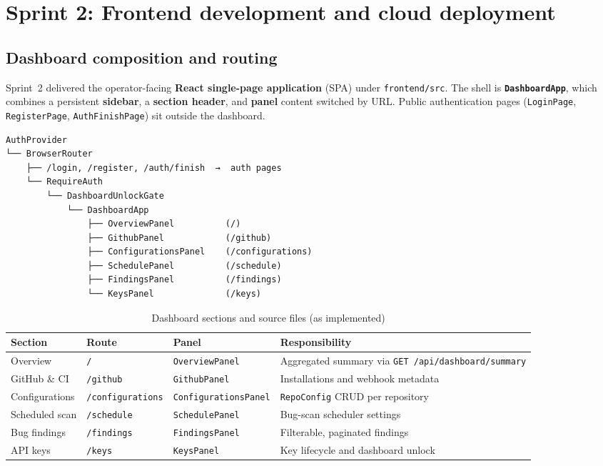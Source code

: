 
\section{Sprint 2: Frontend development and cloud deployment}
\label{sec:sprint2-frontend}

\subsection{Dashboard composition and routing}
\label{subsec:dashboard-routing}

Sprint~2 delivered the operator-facing \textbf{React single-page application} (SPA) under \texttt{frontend/src}. The shell is \textbf{\texttt{DashboardApp}}, which combines a persistent \textbf{sidebar}, a \textbf{section header}, and \textbf{panel} content switched by URL. Public authentication pages (\texttt{LoginPage}, \texttt{RegisterPage}, \texttt{AuthFinishPage}) sit outside the dashboard.

\begin{verbatim}
AuthProvider
└── BrowserRouter
    ├── /login, /register, /auth/finish  →  auth pages
    └── RequireAuth
        └── DashboardUnlockGate
            └── DashboardApp
                ├── OverviewPanel          (/)
                ├── GithubPanel            (/github)
                ├── ConfigurationsPanel    (/configurations)
                ├── SchedulePanel          (/schedule)
                ├── FindingsPanel          (/findings)
                └── KeysPanel              (/keys)
\end{verbatim}

\begin{table}[htbp]
\centering
\caption{Dashboard sections and source files (as implemented)}
\label{tab:dashboard-sections}
\begin{tabular}{p{}p{}p{}p{}}
\toprule
\textbf{Section} & \textbf{Route} & \textbf{Panel} & \textbf{Responsibility} \\
\midrule
Overview & \texttt{/} & \texttt{OverviewPanel} & Aggregated summary via \texttt{GET /api/dashboard/summary} \\
GitHub \& CI & \texttt{/github} & \texttt{GithubPanel} & Installations and webhook metadata \\
Configurations & \texttt{/configurations} & \texttt{ConfigurationsPanel} & \texttt{RepoConfig} CRUD per repository \\
Scheduled scan & \texttt{/schedule} & \texttt{SchedulePanel} & Bug-scan scheduler settings \\
Bug findings & \texttt{/findings} & \texttt{FindingsPanel} & Filterable, paginated findings \\
API keys & \texttt{/keys} & \texttt{KeysPanel} & Key lifecycle and dashboard unlock \\
\bottomrule
\end{tabular}
\end{table}


